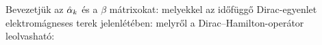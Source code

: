    Bevezetjük az $\hat{\alpha}_k$ és a $\beta$ mátrixokat:
   melyekkel az időfüggő Dirac-egyenlet elektromágneses terek jelenlétében:
   melyről a Dirac--Hamilton-operátor leolvasható:
   
